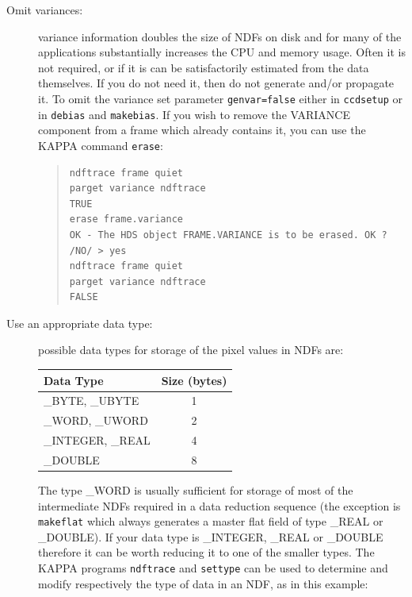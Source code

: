 \documentclass[twoside,11pt]{article}
\begin{document}
\begin{description}

  \item[Omit variances:] variance information doubles the size of NDFs on
   disk and for many of the applications substantially increases the CPU and
   memory usage.
   Often it is not required, or if it is can be satisfactorily estimated
   from the data themselves.
   If you do not need it, then do not generate and/or propagate it.
   To omit the variance set parameter {\tt genvar=false} either in
   {\tt ccdsetup} or in {\tt debias} and {\tt makebias}.
   If you wish to remove the VARIANCE component from a frame which
   already contains it, you can use the KAPPA command {\tt erase}:

  \begin{quote}
  \begin{verbatim}
ndftrace frame quiet
parget variance ndftrace
TRUE
erase frame.variance
OK - The HDS object FRAME.VARIANCE is to be erased. OK ? /NO/ > yes
ndftrace frame quiet
parget variance ndftrace
FALSE
\end{verbatim}
  \end{quote}

  \item[Use an appropriate data type:] possible data types for storage of
   the pixel values in NDFs are:

  \begin{center}
  \begin{tabular}{lc}
   Data Type         & Size (bytes) \\ \hline
   \_BYTE, \_UBYTE   & 1 \\
   \_WORD, \_UWORD   & 2 \\
   \_INTEGER, \_REAL & 4 \\
   \_DOUBLE          & 8 \\
  \end{tabular}
  \end{center}

   The type \_WORD is usually sufficient for storage of most
   of the intermediate NDFs required in a data reduction sequence
   (the exception is {\tt makeflat} which always generates a master flat
   field of type \_REAL or \_DOUBLE).
   If your data type is \_INTEGER, \_REAL or \_DOUBLE therefore
   it can be worth reducing it to one of the smaller types.
   The KAPPA programs {\tt ndftrace} and {\tt settype} can be used to
   determine and modify respectively the type of data in an NDF, as in this
   example:


\end{description}
\end{document}
